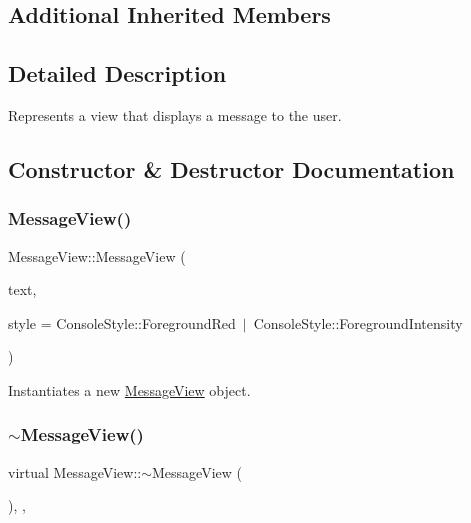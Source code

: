 \subsection*{Additional Inherited Members}


\subsection{Detailed Description}
Represents a view that displays a message to the user. 



\subsection{Constructor \& Destructor Documentation}
\mbox{\label{class_message_view_abc1653c6ab2af11fde46ae4ad229edf5}} 
\subsubsection{\texorpdfstring{MessageView()}{MessageView()}}
{\footnotesize\ttfamily Message\+View\+::\+Message\+View (\begin{DoxyParamCaption}\item[{std\+::string}]{text,  }\item[{Console\+Style}]{style = {\ttfamily ConsoleStyle\+:\+:ForegroundRed~$\vert$~ConsoleStyle\+:\+:ForegroundIntensity} }\end{DoxyParamCaption})}



Instantiates a new \mbox{\hyperlink{class_message_view}{Message\+View}} object. 

\mbox{\label{class_message_view_a077941ec2d1a8de678ec78cdbc420716}} 
\subsubsection{\texorpdfstring{$\sim$MessageView()}{~MessageView()}}
{\footnotesize\ttfamily virtual Message\+View\+::$\sim$\+Message\+View (\begin{DoxyParamCaption}{ }\end{DoxyParamCaption})\hspace{0.3cm}{\ttfamily [inline]}, {\ttfamily [override]}, {\ttfamily [virtual]}}



